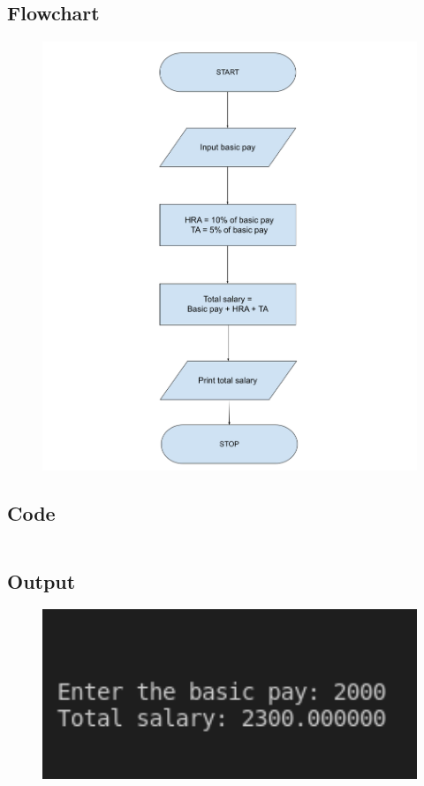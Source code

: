 \documentclass[12pt]{article}
\begin{document}
\subsection{Flowchart}
\begin{figure}[h]
    \centering
    \includegraphics[width=1.0\textwidth]{Flowchart08.png}
\end{figure}
\newpage
\subsection{Code}
\inputminted{c}{q8.c}
\subsection{Output}
\begin{figure}[h]
    \centering
    \includegraphics[width=1.0\textwidth]{8.png}
\end{figure}
\newpage
\end{document}
